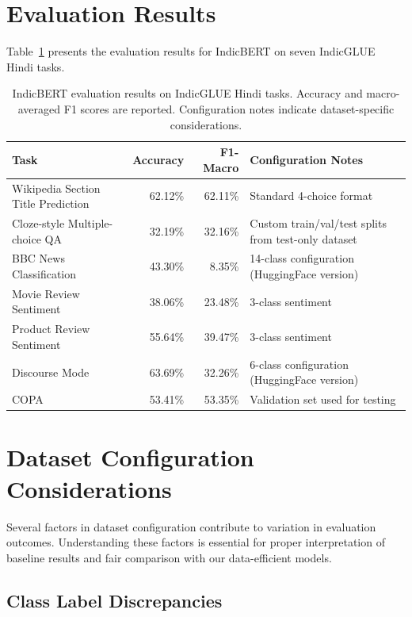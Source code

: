 \section{Evaluation Results}
\label{sec:indicbert-results}

Table~\ref{tab:indicbert-results} presents the evaluation results for IndicBERT on seven IndicGLUE Hindi tasks.

\begin{table}[h]
\centering
\begin{tabular}{lrrp{4.5cm}}
\toprule
\textbf{Task} & \textbf{Accuracy} & \textbf{F1-Macro} & \textbf{Configuration Notes} \\
\midrule
Wikipedia Section Title Prediction & 62.12\% & 62.11\% & Standard 4-choice format \\
Cloze-style Multiple-choice QA & 32.19\% & 32.16\% & Custom train/val/test splits from test-only dataset \\
BBC News Classification & 43.30\% & 8.35\% & 14-class configuration (HuggingFace version) \\
Movie Review Sentiment & 38.06\% & 23.48\% & 3-class sentiment \\
Product Review Sentiment & 55.64\% & 39.47\% & 3-class sentiment \\
Discourse Mode & 63.69\% & 32.26\% & 6-class configuration (HuggingFace version) \\
COPA & 53.41\% & 53.35\% & Validation set used for testing \\
\bottomrule
\end{tabular}
\caption{IndicBERT evaluation results on IndicGLUE Hindi tasks. Accuracy and macro-averaged F1 scores are reported. Configuration notes indicate dataset-specific considerations.}
\label{tab:indicbert-results}
\end{table}

\section{Dataset Configuration Considerations}
\label{sec:dataset-considerations}

Several factors in dataset configuration contribute to variation in evaluation outcomes. Understanding these factors is essential for proper interpretation of baseline results and fair comparison with our data-efficient models.

\subsection{Class Label Discrepancies}

